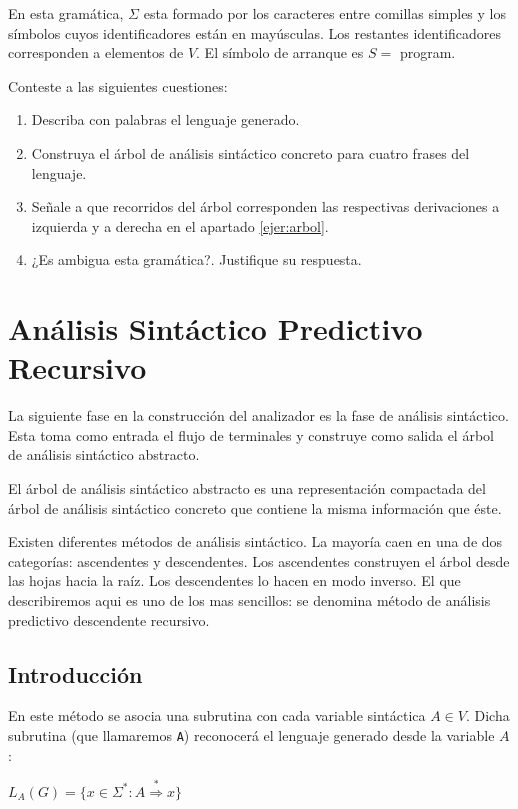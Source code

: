 En esta gramática, $\Sigma$ esta formado por los caracteres entre comillas simples y 
los símbolos cuyos identificadores están en mayúsculas. Los restantes identificadores
corresponden a elementos de $V$. El símbolo de arranque es $S =$ program.

Conteste a las siguientes cuestiones:

\begin{enumerate}
\item
Describa con palabras el lenguaje generado.
\item
\label{ejer:arbol}
Construya el árbol de análisis sintáctico
concreto para cuatro frases del lenguaje.
\item
Señale a que recorridos del árbol corresponden las respectivas
derivaciones a izquierda y a derecha en el apartado \ref{ejer:arbol}.
\item
¿Es ambigua esta gramática?. Justifique su respuesta.
\end{enumerate}

\section{Análisis Sintáctico Predictivo Recursivo}
\label{section:predictivo}
La siguiente fase en la construcción del analizador es la fase de 
análisis sintáctico. Esta toma como entrada el flujo de terminales
y construye como salida el árbol de análisis sintáctico abstracto.

El árbol de análisis sintáctico abstracto es una representación  compactada del árbol 
de análisis sintáctico concreto que contiene la misma información que éste.

Existen diferentes métodos de análisis sintáctico. La mayoría caen en una de dos categorías:
ascendentes y descendentes. Los ascendentes construyen el árbol desde las hojas
hacia la raíz. Los descendentes lo hacen en modo inverso. El que describiremos
aqui es uno de los mas sencillos: se denomina método de análisis predictivo descendente 
recursivo.

\subsection{Introducción}
\label{subsection:introduccion}
En este método se asocia una subrutina con cada variable sintáctica $A \in V$. Dicha subrutina 
(que llamaremos \verb|A|) reconocerá el lenguaje generado desde la variable $A$:

\begin{center}
$L_A(G) = \{ x \in \Sigma^* : A \stackrel{*}{\Longrightarrow} x \}$
\end{center}

